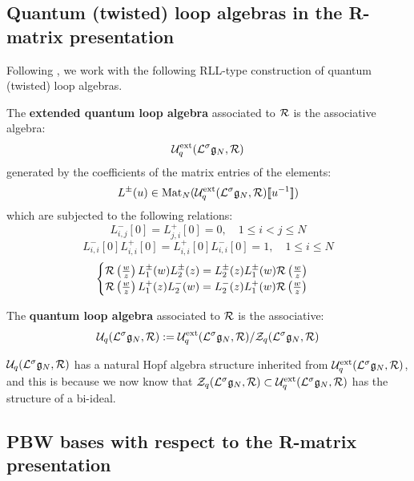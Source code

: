     \subsection{Quantum (twisted) loop algebras in the R-matrix presentation}
        Following \cite{guay_regelskis_wendlandt_R_matrix_presentation_of_quantum_loop_algebras}, we work with the following RLL-type construction of quantum (twisted) loop algebras.
        \begin{definition} \label{def: extended_quantum_loop_algebras}
            The \textbf{extended quantum loop algebra} associated to $\mathcal{R}$ is the associative algebra:
                $$\mathcal{U}_q^{\mathrm{ext}}(\mathcal{L}^{\sigma}\mathfrak{g}_N, \mathcal{R})$$
            generated by the coefficients of the matrix entries of the elements:
                $$L^{\pm}(u) \in \operatorname{Mat}_N( \mathcal{U}_q^{\mathrm{ext}}(\mathcal{L}^{\sigma}\mathfrak{g}_N, \mathcal{R})[\![u^{-1}]\!] )$$
            which are subjected to the following relations:
                $$L_{i, j}^-[0] = L_{j, i}^+[0] = 0, \quad 1 \leq i < j \leq N$$
                $$L_{i, i}^-[0] L_{i, i}^+[0] = L_{i, i}^+[0] L_{i, i}^-[0] = 1, \quad 1 \leq i \leq N$$
                $$
                    \begin{cases}
                        \mathcal{R}\left(\frac{w}{z}\right) L_1^{\pm}(w) L_2^{\pm}(z) = L_2^{\pm}(z) L_1^{\pm}(w) \mathcal{R}\left(\frac{w}{z}\right)
                        \\
                        \mathcal{R}\left(\frac{w}{z}\right) L_1^+(z) L_2^-(w) = L_2^-(z) L_1^+(w) \mathcal{R}\left(\frac{w}{z}\right)
                    \end{cases}
                $$
        \end{definition}



        \begin{definition} \label{def: quantum_loop_algebras}
            The \textbf{quantum loop algebra} associated to $\mathcal{R}$ is the associative:
                $$\mathcal{U}_q(\mathcal{L}^{\sigma}\mathfrak{g}_N, \mathcal{R}) := \mathcal{U}_q^{\mathrm{ext}}(\mathcal{L}^{\sigma}\mathfrak{g}_N, \mathcal{R})/\mathcal{Z}_q(\mathcal{L}^{\sigma}\mathfrak{g}_N, \mathcal{R})$$
        \end{definition}
        \begin{remark}
            $\mathcal{U}_q(\mathcal{L}^{\sigma}\mathfrak{g}_N, \mathcal{R})$ has a natural Hopf algebra structure inherited from $\mathcal{U}_q^{\mathrm{ext}}(\mathcal{L}^{\sigma}\mathfrak{g}_N, \mathcal{R})$, and this is because we now know that $\mathcal{Z}_q(\mathcal{L}^{\sigma}\mathfrak{g}_N, \mathcal{R}) \subset \mathcal{U}_q^{\mathrm{ext}}(\mathcal{L}^{\sigma}\mathfrak{g}_N, \mathcal{R})$ has the structure of a bi-ideal.
        \end{remark}

    \subsection{PBW bases with respect to the R-matrix presentation}